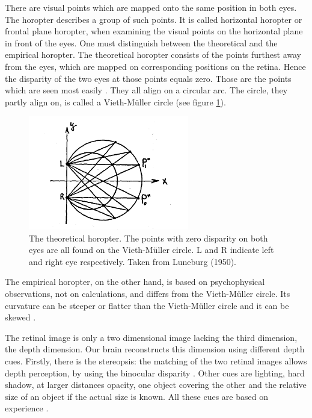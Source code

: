 There are visual points which are mapped onto the same position in both eyes. The horopter describes a group of such points. It is called horizontal horopter or frontal plane horopter, when examining the visual points on the horizontal plane in front of the eyes. One must distinguish between the theoretical and the empirical horopter. The theoretical horopter consists of the points furthest away from the eyes, which are mapped on corresponding positions on the retina. Hence the disparity of the two eyes at those points equals zero. Those are the points which are seen most easily \cite{DeValois.2000, Helmholtz.1867}. %
They all align on a circular arc. The circle, they partly align on, is called a Vieth-Müller circle (see figure \ref{horopterLuneburg}).
\begin{figure}
    \centering
    \includegraphics[width=7cm]{Images/Horopter from Luneburg 1950.png}%
    \caption{The theoretical horopter. The points with zero disparity on both eyes are all found on the Vieth-Müller circle. L and R indicate left and right eye respectively. Taken from Luneburg (1950).} 
    \label{horopterLuneburg}
\end{figure}
The empirical horopter, on the other hand, is based on psychophysical observations, not on calculations, and differs from the Vieth-Müller circle. Its curvature can be steeper or flatter than the Vieth-Müller circle and it can be skewed \cite{DeValois.2000}.

The retinal image is only a two dimensional image lacking the third dimension, the depth dimension. Our brain reconstructs this dimension using different depth cues. 
Firstly, there is the stereopsis: the matching of the two retinal images allows depth perception, by using the binocular disparity \cite{Mallot.2000}. 
Other cues are lighting, hard shadow, at larger distances o\-pa\-ci\-ty, one object covering the other and the relative size of an object if the actual size is known. All these cues are based on experience \cite{Helmholtz.1867}.


